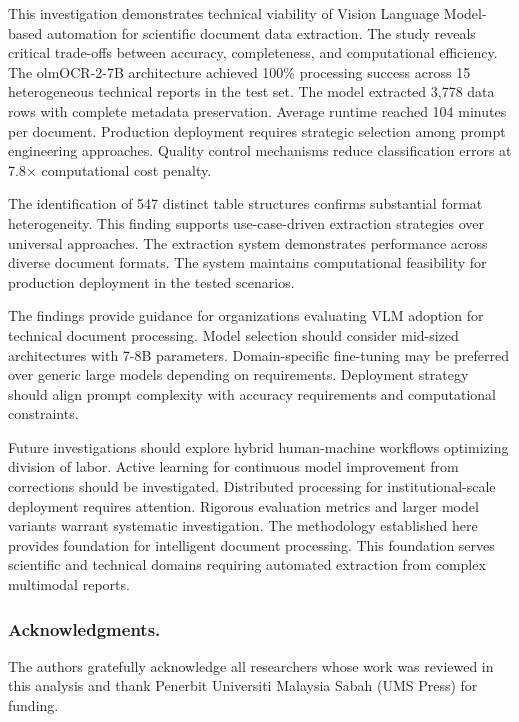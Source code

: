 \documentclass{svproc}
\begin{document}
This investigation demonstrates technical viability of Vision Language Model-based automation for scientific document data extraction. The study reveals critical trade-offs between accuracy, completeness, and computational efficiency. The olmOCR-2-7B architecture achieved 100\% processing success across 15 heterogeneous technical reports in the test set. The model extracted 3,778 data rows with complete metadata preservation. Average runtime reached 104 minutes per document. Production deployment requires strategic selection among prompt engineering approaches. Quality control mechanisms reduce classification errors at 7.8× computational cost penalty.

The identification of 547 distinct table structures confirms substantial format heterogeneity. This finding supports use-case-driven extraction strategies over universal approaches. The extraction system demonstrates performance across diverse document formats. The system maintains computational feasibility for production deployment in the tested scenarios.

The findings provide guidance for organizations evaluating VLM adoption for technical document processing. Model selection should consider mid-sized architectures with 7-8B parameters. Domain-specific fine-tuning may be preferred over generic large models depending on requirements. Deployment strategy should align prompt complexity with accuracy requirements and computational constraints.

Future investigations should explore hybrid human-machine workflows optimizing division of labor. Active learning for continuous model improvement from corrections should be investigated. Distributed processing for institutional-scale deployment requires attention. Rigorous evaluation metrics and larger model variants warrant systematic investigation. The methodology established here provides foundation for intelligent document processing. This foundation serves scientific and technical domains requiring automated extraction from complex multimodal reports.

\subsubsection{Acknowledgments.}

The authors gratefully acknowledge all researchers whose work was reviewed in this analysis and thank Penerbit Universiti Malaysia Sabah (UMS Press) for funding.
\end{document}
